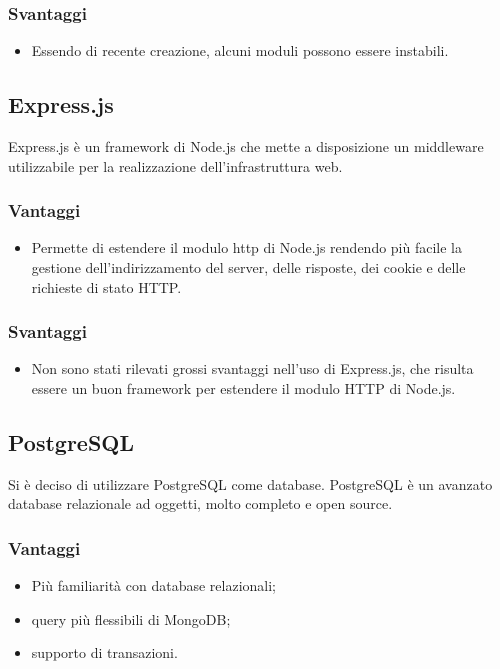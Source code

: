 \documentclass[a4paper, titlepage]{article}
\begin{document}
\subsubsection{Svantaggi}

\begin{itemize}
	\item Essendo di recente creazione, alcuni moduli possono essere instabili.
\end{itemize}

\subsection{Express.js}
Express.js è un framework di Node.js che mette a disposizione un middleware utilizzabile per la realizzazione dell’infrastruttura web.

\subsubsection{Vantaggi}

\begin{itemize}
	\item Permette di estendere il modulo http di Node.js rendendo più facile la gestione dell’indirizzamento del server, delle risposte, dei cookie e delle richieste di stato HTTP.
\end{itemize}

\subsubsection{Svantaggi}

\begin{itemize}
	\item Non sono stati rilevati grossi svantaggi nell'uso di Express.js, che risulta essere un buon framework per estendere il modulo HTTP di Node.js.
\end{itemize}

\subsection{PostgreSQL}
Si è deciso di utilizzare PostgreSQL come database. PostgreSQL è un avanzato database relazionale ad oggetti, molto completo e open source.
\subsubsection{Vantaggi}

\begin{itemize}
	\item Più familiarità con database relazionali;
	\item query più flessibili di MongoDB;
	\item supporto di transazioni.
\end{itemize}
\end{document}
